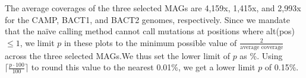 The average coverages of the three selected MAGs are 4,159x, 1,415x, and 2,993x for the CAMP, BACT1, and BACT2 genomes, respectively. Since we mandate that the na\"ive calling method cannot call mutations at positions where alt(pos) $\leq 1$, we limit $p$ in these plots to the minimum possible value of $\frac{2}{\text{average coverage}}$ across the three selected MAGs.We thus set the lower limit of $p$ as  \%. Using $\bigg\lceil \frac{p \cdot 100}{100} \bigg\rceil$ to round this value to the nearest 0.01\%, we get a lower limit $p$ of 0.15\%.\endinput